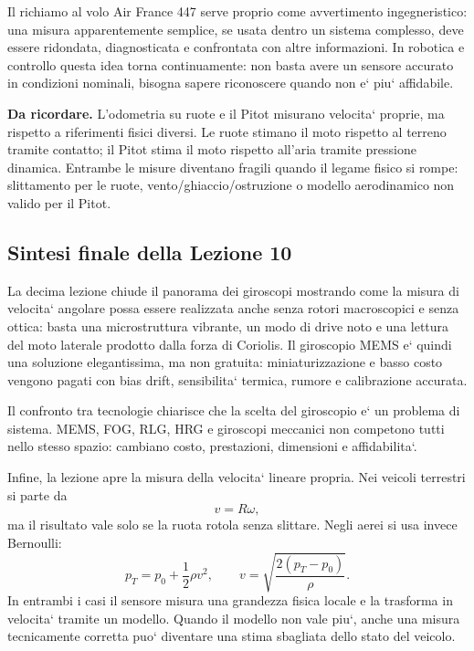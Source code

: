\documentclass[11pt,a4paper]{article}
\begin{document}
Il richiamo al volo Air France 447 serve proprio come avvertimento ingegneristico: una misura apparentemente semplice, se usata dentro un sistema complesso, deve essere ridondata, diagnosticata e confrontata con altre informazioni. In robotica e controllo questa idea torna continuamente: non basta avere un sensore accurato in condizioni nominali, bisogna sapere riconoscere quando non e` piu` affidabile.

\begin{keybox}
\textbf{Da ricordare.} L'odometria su ruote e il Pitot misurano velocita` proprie, ma rispetto a riferimenti fisici diversi. Le ruote stimano il moto rispetto al terreno tramite contatto; il Pitot stima il moto rispetto all'aria tramite pressione dinamica. Entrambe le misure diventano fragili quando il legame fisico si rompe: slittamento per le ruote, vento/ghiaccio/ostruzione o modello aerodinamico non valido per il Pitot.
\end{keybox}

\subsection*{Sintesi finale della Lezione 10}

La decima lezione chiude il panorama dei giroscopi mostrando come la misura di velocita` angolare possa essere realizzata anche senza rotori macroscopici e senza ottica: basta una microstruttura vibrante, un modo di drive noto e una lettura del moto laterale prodotto dalla forza di Coriolis. Il giroscopio MEMS e` quindi una soluzione elegantissima, ma non gratuita: miniaturizzazione e basso costo vengono pagati con bias drift, sensibilita` termica, rumore e calibrazione accurata.

Il confronto tra tecnologie chiarisce che la scelta del giroscopio e` un problema di sistema. MEMS, FOG, RLG, HRG e giroscopi meccanici non competono tutti nello stesso spazio: cambiano costo, prestazioni, dimensioni e affidabilita`.

Infine, la lezione apre la misura della velocita` lineare propria. Nei veicoli terrestri si parte da
\[
v=R\omega,
\]
ma il risultato vale solo se la ruota rotola senza slittare. Negli aerei si usa invece Bernoulli:
\[
p_T=p_0+\frac{1}{2}\rho v^2,
\qquad
v=\sqrt{\frac{2(p_T-p_0)}{\rho}}.
\]
In entrambi i casi il sensore misura una grandezza fisica locale e la trasforma in velocita` tramite un modello. Quando il modello non vale piu`, anche una misura tecnicamente corretta puo` diventare una stima sbagliata dello stato del veicolo.
\end{document}
